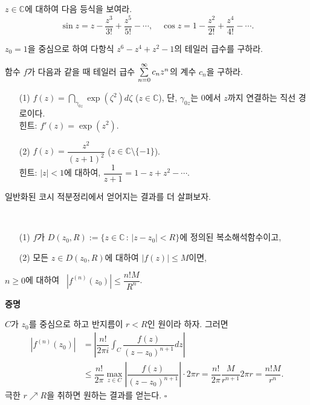 \begin{salt_exercise} \label{ex-4-12}
$z\in\mathbb C$에 대하여 다음 등식을 보여라.
\[
\sin z = z - \dfrac{z^3}{3!} + \dfrac{z^5}{5!} - \cdots,
\quad
\cos z = 1 - \dfrac{z^2}{2!} + \dfrac{z^4}{4!} - \cdots.
\]
\end{salt_exercise}

\begin{salt_exercise} \label{ex-4-13}
$z_0=1$을 중심으로 하여
다항식 $z^6-z^4 + z^2 -1$의 테일러 급수를 구하라.
\end{salt_exercise}

\begin{salt_exercise} \label{ex-4-14}
함수 $f$가 다음과 같을 때 테일러 급수 $\sum\limits_{n=0}^\infty c_nz^n$의 계수 $c_n$을 구하라.
\begin{itemize}
\item[(1)] $f(z) = \dint_{\gamma_{0z}} \exp(\zeta^2)d\zeta$ ($z\in\mathbb C$),
단, $\gamma_{0z}$는 $0$에서 $z$까지 연결하는 직선 경로이다. \\
힌트: $f'(z) = \exp(z^2)$.
\item[(2)] $f(z) = \dfrac{z^2}{(z+1)^2}$ ($z\in \mathbb C\setminus \{-1\}$). \\
힌트: $|z|<1$에 대하여, $\dfrac1{z+1} = 1- z + z^2 - \cdots$.
\end{itemize}
\end{salt_exercise}

일반화된 코시 적분정리에서 얻어지는 결과를 더 살펴보자.

\begin{salt_corollary}[코시 부등식] \label{coro-4-5}
\ 
\begin{itemize}
\item[(1)] $f$가 $D(z_0, R):= \{z \in \mathbb C\,:\, |z-z_0| <R \}$에 정의된
복소해석함수이고,
\item[(2)] 모든 $z\in D(z_0,R)$에 대하여 $|f(z)|\le M$이면,
\end{itemize}
$n\ge0$에 대하여  \ $|f^{(n)}(z_0)| \le \dfrac{n! M}{R^n}$.
\end{salt_corollary}

{\bf 증명}

$C$가 $z_0$를 중심으로 하고 반지름이 $r<R$인 원이라 하자. 그러면
\begin{align*}
|f^{(n)}(z_0)| &= \left| \dfrac{n!}{2\pi i} \int_C \dfrac{f(z)}{(z-z_0)^{n+1}}dz \right| \\
&\le \dfrac{n!}{2\pi} \max_{z\in C} \left| \dfrac{f(z)}{(z-z_0)^{n+1}} \right| \cdot 
2\pi r = \dfrac{n!}{2\pi} \dfrac{M}{r^{n+1}}2\pi r = \dfrac{n! M}{r^n}.
\end{align*}
극한 $r\nearrow R$을 취하면 원하는 결과를 얻는다. 
\hfill $\square$

